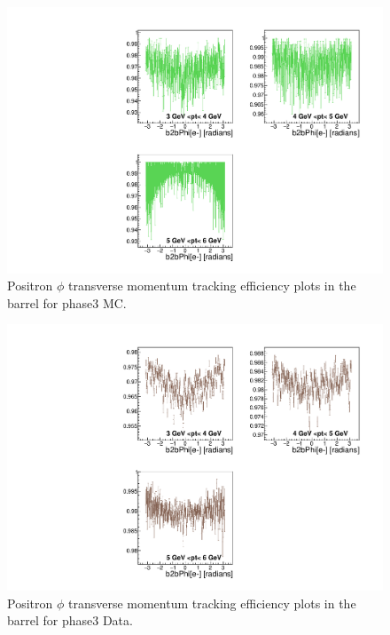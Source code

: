 \documentclass[a4paper,11pt,twosided,final,german,openbib,pdftex,listof=totoc,bibliography=totoc]{scrbook}
\begin{document}
\begin{appendix}
\begin{figure}[!htbp]
	\centering
	\includegraphics[width=\textwidth]{Plots/master3/xPtMPhiepBarrel_MCP3}
	\caption[Transverse Momentum $\phi$ Positron Barrel Efficiency Phase3 MC]{Positron $\phi$ transverse momentum tracking efficiency plots in the barrel for phase3 MC.}
	\label{plt:PtMPhiepBarrel3_MC}
\end{figure}


\begin{figure}[!htbp]
	\centering
	\includegraphics[width=\textwidth]{Plots/master3/xPtMPhiepBarrel_DataP3}
	\caption[Transverse Momentum $\phi$ Positron Barrel Efficiency Phase3 Data]{Positron $\phi$ transverse  momentum tracking efficiency plots in the barrel for phase3 Data.}
	\label{plt:PtMPhiepBarrel3_Data}
\end{figure}




\end{appendix}
\end{document}

